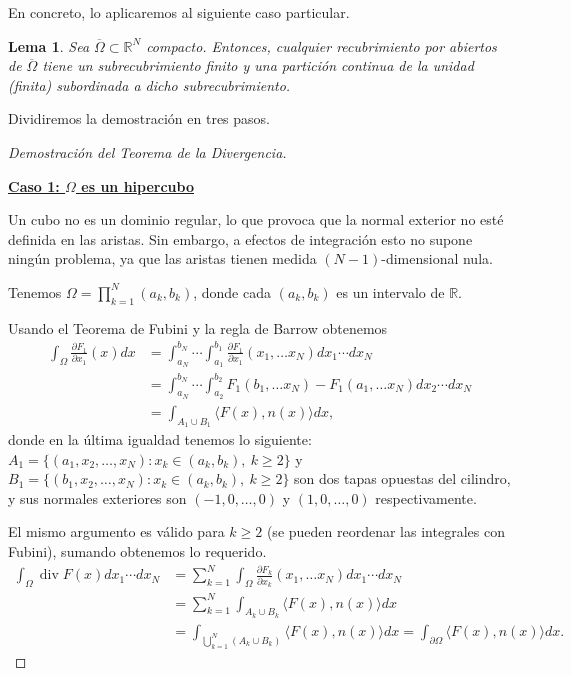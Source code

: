 \documentclass[12pt,spanish]{article}
\newtheorem{lemma}[theorem]{Lema}
\theoremstyle{definition}
\theoremstyle{remark}
\begin{document}
En concreto, lo aplicaremos al siguiente caso particular.

\begin{lemma}
	Sea $\overline{\Omega}\subset\mathbb{R}^N$ compacto. Entonces, cualquier recubrimiento por abiertos de $\overline{\Omega}$ tiene un subrecubrimiento finito y una partición continua de la unidad (finita) subordinada a dicho subrecubrimiento.
\end{lemma}

Dividiremos la demostración en tres pasos.

\begin{proof}[Demostración del Teorema de la Divergencia] ~
	
	\underline{\textbf{Caso 1: $\Omega$ es un hipercubo}}
	
	Un cubo no es un dominio regular, lo que provoca que la normal exterior no esté definida en las aristas. Sin embargo, a efectos de integración esto no supone ningún problema, ya que las aristas tienen medida $(N-1)$-dimensional nula.
	
	Tenemos $\displaystyle{\Omega=\prod_{k=1}^{N}(a_k,b_k)}$, donde cada $(a_k,b_k)$ es un intervalo de $\mathbb{R}$.
	
	Usando el Teorema de Fubini y la regla de Barrow obtenemos
	\begin{align*}
	\int_\Omega \frac{\partial F_1}{\partial x_1}(x)dx&=\int_{a_N}^{b_N}\cdots\int_{a_1}^{b_1}\frac{\partial F_1}{\partial x_1}(x_1,\ldots x_N) dx_1\cdots dx_N \\ &=\int_{a_N}^{b_N}\cdots\int_{a_2}^{b_2}F_1(b_1,\ldots x_N)-F_1(a_1,\ldots x_N) dx_2\cdots dx_N \\ &=\int_{A_1\cup B_1}\langle F(x),n(x)\rangle dx,
	\end{align*}
	donde en la última igualdad tenemos lo siguiente: $A_1=\{(a_1,x_2,\ldots,x_N): x_k\in(a_k,b_k), \ k\geq 2\}$ y $B_1=\{(b_1,x_2,\ldots,x_N): x_k\in(a_k,b_k), \ k\geq 2\}$ son dos tapas opuestas del cilindro, y sus normales exteriores son $(-1,0,\ldots,0)$ y $(1,0,\ldots,0)$ respectivamente.
	
	El mismo argumento es válido para $k\geq 2$ (se pueden reordenar las integrales con Fubini), sumando obtenemos lo requerido.
	\begin{align*}
	\int_\Omega\operatorname{div}F(x) dx_1\cdots dx_N&=\sum_{k=1}^N \int_\Omega\frac{\partial F_k}{\partial x_k}(x_1,\ldots x_N) dx_1\cdots dx_N \\
	&=\sum_{k=1}^N\int_{A_k\cup B_k}\langle F(x),n(x)\rangle dx \\ &=\int_{\bigcup\limits_{k=1}^N (A_k\cup B_k)}\langle F(x),n(x)\rangle dx=\int_{\partial\Omega}\langle F(x),n(x)\rangle dx.
	\end{align*}
	

\end{proof}
\end{document}
